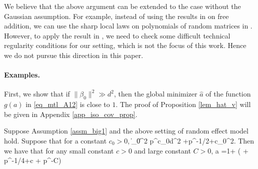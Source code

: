 We believe that the above argument can be extended to the case without the Gaussian assumption. For example, instead of using the results in \cite{BES_free1,BES_free2} on free addition, we can use the sharp local laws on polynomials of random matrices in \cite{EKN_poly}. However, to apply the result in \cite{EKN_poly}, we need to check some difficult technical regularity conditions for our setting, which is not the focus of this work. Hence we do not pursue this direction in this paper.


\paragraph{Examples.}
First, we show that if $\|\beta_0\|^2 \gg d^2$, then the global minimizer $\hat a$ of the function $g(a)$ in \eqref{eq_mtl_A12} is close to $1$.
	The proof of Proposition \ref{lem_hat_v} will be given in Appendix \ref{app_iso_cov_prop}.

	\begin{proposition}\label{lem_hat_v}
Suppose Assumption \ref{assm_big1} and the above setting of random effect model hold. %
Suppose that for a constant $c_0>0$,
	\be\label{para_rel}
	 \|\beta_0\|^2 \ge p^{c_0}d^2 +p^{-1/2+c_0}\sigma^2.
	\ee
 Then we have that for any small constant $c>0$ and large constant $ C>0$,
	\be\label{hatw_add1}
	 \hat a =1+ \OO\left( + p^{-1/4+c}  + p^{-C}\right) \quad {}
	\ee
\end{proposition}

